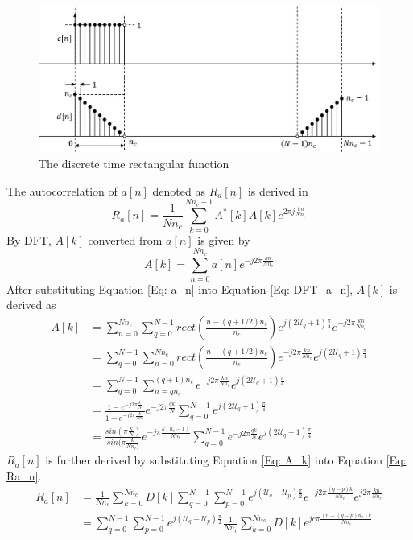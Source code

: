 \documentclass[draftcls,onecolumn]{IEEEtran}  %
\begin{document}
\begin{figure}[t!]
	\centering
	\includegraphics[width=3 in]{pdf/rect_auto.jpg}
	\caption{The discrete time rectangular function}
	\label{fig:c_n_d_n}
\end{figure}
The autocorrelation of $a[n]$ denoted as $R_a[n]$ is derived in 
\begin{equation}\label{Eq: Ra_n}
R_a[n] = \frac{1}{Nn_c}\sum\limits_{k=0}^{Nn_c-1} A^*[k]A[k] e^{2\pi j \frac{kn}{Nn_c}}
\end{equation}
By DFT, $A[k]$ converted from $a[n]$ is given by
\begin{equation}\label{Eq: DFT_a_n}
A[k] = \sum\limits_{n=0}^{Nn_c} a[n]e^{-j2\pi \frac{kn}{Nn_c}}
\end{equation}
After substituting Equation \ref{Eq: a_n} into Equation \ref{Eq: DFT_a_n}, $A[k]$ is derived as
\begin{equation}\label{Eq: A_k}
\begin{split}
A[k] &= \sum\limits_{n=0}^{Nn_c} \sum\limits_{q=0}^{N-1} rect(\frac{n-(q+1/2)n_c}{n_c}) e^{j(2\mathcal{U}_q+1)\frac{\pi}{4}} e^{-j2\pi \frac{kn}{Nn_c}} \\ 
     &= \sum\limits_{q=0}^{N-1} \sum\limits_{n=0}^{Nn_c} rect(\frac{n-(q+1/2)n_c}{n_c}) e^{-j2\pi \frac{kn}{Nn_c}} e^{j(2\mathcal{U}_q+1)\frac{\pi}{4}} \\ 
     &= \sum\limits_{q=0}^{N-1} \sum\limits_{n=qn_c}^{(q+1)n_c} e^{-j2\pi \frac{kn}{Nn_c}} e^{j(2\mathcal{U}_q+1)\frac{\pi}{4}} \\
     &= \frac{1-e^{-j2\pi\frac{k}{N}}} {1-e^{-j2\pi\frac{k}{Nn_c}}} e^{-j2\pi \frac{qk}{N}} \sum\limits_{q=0}^{N-1} e^{j(2\mathcal{U}_q+1)\frac{\pi}{4}} \\
     &= \frac{sin(\pi\frac{k}{N})} {sin(\pi\frac{k}{Nn_c)}} e^{-j\pi \frac{k(n_c-1)}{Nn_c}} \sum\limits_{q=0}^{N-1} e^{-j2\pi \frac{qk}{N}} e^{j(2\mathcal{U}_q+1)\frac{\pi}{4}} 
\end{split}
\end{equation} 
$R_a[n]$ is further derived by substituting Equation \ref{Eq: A_k} into Equation \ref{Eq: Ra_n}.
\begin{equation}\label{Eq: IDFT_Ra1}
\begin{split}
R_a[n] &= \frac{1}{Nn_c}\sum\limits_{k=0}^{Nn_c} D[k] 
\sum\limits_{q=0}^{N-1} \sum\limits_{p=0}^{N-1} 
e^{j(\mathcal{U}_q-\mathcal{U}_p)\frac{\pi}{2}} 
e^{-j2\pi \frac{(q-p)k}{Nn_c}}
e^{j2\pi \frac{kn}{Nn_c}} \\
 &= \sum\limits_{q=0}^{N-1} \sum\limits_{p=0}^{N-1} 
e^{j(\mathcal{U}_q-\mathcal{U}_p)\frac{\pi}{2}} 
\frac{1}{Nn_c}\sum\limits_{k=0}^{Nn_c} D[k] e^{jc\pi \frac{(n-(q-p)n_c) k}{Nn_c}}
\end{split}
\end{equation}
\end{document}
